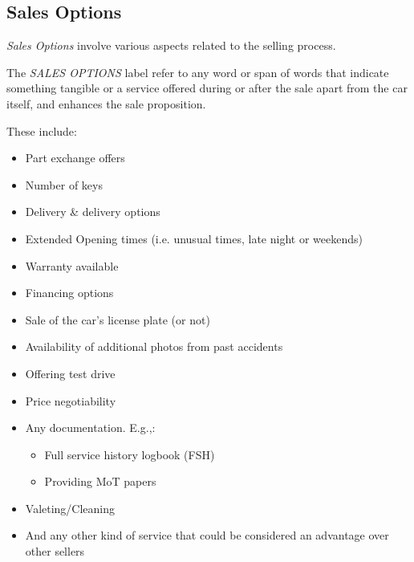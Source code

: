 \documentclass[11pt]{article}
\begin{document}
\subsection*{Sales Options}

\textit{Sales Options} involve various aspects related to the selling process. 

\begin{tcolorbox}[colback=gray!5!white, colframe=gray!75!black, title=Definition]
The \textit{SALES OPTIONS} label refer to any word or span of words that indicate something tangible or a service offered during or after the sale apart from the car itself, and enhances the sale proposition. 
\end{tcolorbox}

These include:
\begin{itemize}
    \item Part exchange offers
    \item Number of keys
    \item Delivery \& delivery options
    \item Extended Opening times (i.e. unusual times, late night or weekends)
    \item Warranty available
    \item Financing options
    \item Sale of the car's license plate (or not)
    \item Availability of additional photos from past accidents
    \item Offering test drive
    \item Price negotiability
    \item Any documentation. E.g.,:
        \begin{itemize}
            \item Full service history logbook (FSH)
            \item Providing MoT papers
        \end{itemize}
    \item Valeting/Cleaning
    \item And any other kind of service that could be considered an advantage over other sellers
\end{itemize}

\end{document}
